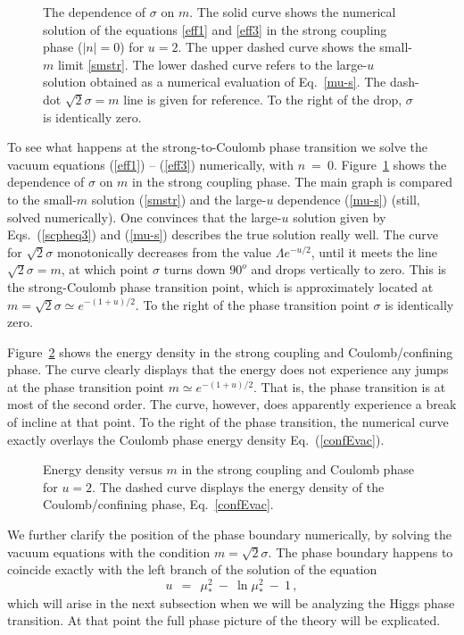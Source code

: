 \documentclass[epsfig,12pt]{article}
\begin{document}
{\begin{figure}
\epsfxsize=10cm
\centerline{}
\caption{\small The dependence of $\sigma$ on $m$. The solid curve shows the numerical solution
of the equations \eqref{eff1} and \eqref{eff3} in the strong coupling phase ($|n| = 0 $) for $u = 2$.
The upper dashed curve shows the small-$m$ limit \eqref{smstr}.
The lower dashed curve refers to the large-$u$ solution obtained as a numerical evaluation of
Eq.~\eqref{mu-s}.
The dash-dot $ \sqrt{2}\sigma = m $ line is given for reference.
To the right of the drop, $ \sigma $ is identically zero.}
\label{fig:numsigm}
\end{figure}
To see what happens at the strong-to-Coulomb phase transition we solve the vacuum equations 
(\ref{eff1}) -- (\ref{eff3}) numerically, with $ n ~=~ 0 $.
Figure~\ref{fig:numsigm} shows the dependence of $ \sigma $ on $ m $ in the strong
coupling phase. 
The main graph is compared to the small-$m$ solution (\ref{smstr}) and the large-$u$
dependence (\ref{mu-s}) (still, solved numerically). 
One convinces that the large-$u$ solution given by Eqs.~(\ref{scpheq3}) and (\ref{mu-s})
describes the true solution really well. 
The curve for $\sqrt{2}\sigma$ monotonically decreases from the value $\Lambda e^{-u/2}$, 
until it meets the line $ \sqrt{2}\sigma = m $,
at which point $ \sigma $ turns down $ 90^o $ and drops vertically to zero. 
This is the strong-Coulomb phase transition point, which is approximately located at
$ m = \sqrt{2}\sigma \simeq e^{-(1+u)/2} $.
To the right of the phase transition point $ \sigma $ is identically zero. 

Figure~\ref{fig:numEm} shows the energy density in the strong coupling and Coulomb/confining phase. 
The curve clearly displays that the energy does not experience any jumps at the phase transition 
point $ m \simeq e^{-(1+u)/2} $.
That is, the phase transition is at most of the second order.
The curve, however, does apparently experience a break of incline at that point. 
To the right of the phase transition, the numerical curve exactly overlays the Coulomb phase
energy density Eq.~(\ref{confEvac}).
\begin{figure}
\epsfxsize=10cm
\centerline{}
\caption{\small Energy density versus $m$ in the strong coupling and Coulomb phase for $u=2$. 
The dashed curve displays the energy density of the Coulomb/confining phase, Eq.~\eqref{confEvac}.}
\label{fig:numEm}
\end{figure}

We further clarify the position of the phase boundary numerically, by solving
the vacuum equations with the condition $ m = \sqrt{2} \sigma $. 
The phase boundary happens to coincide exactly with the left branch of the solution of 
the equation
\[
	u  ~~=~~ \mu_*^2 ~-~ \ln \mu_*^2 ~-~ 1\,,
\]
which will arise in the next subsection when we will be analyzing the Higgs phase transition.
At that point the full phase picture of the theory will be explicated. 

}
\end{document}
